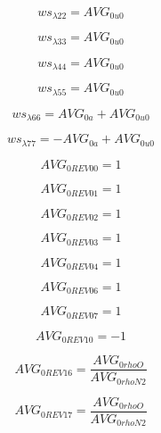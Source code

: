 \documentclass{article}
\begin{document}
\begin{dmath}ws_{\lambda 22} = AVG_{0 u0}\end{dmath}

\begin{dmath}ws_{\lambda 33} = AVG_{0 u0}\end{dmath}

\begin{dmath}ws_{\lambda 44} = AVG_{0 u0}\end{dmath}

\begin{dmath}ws_{\lambda 55} = AVG_{0 u0}\end{dmath}

\begin{dmath}ws_{\lambda 66} = AVG_{0 a} + AVG_{0 u0}\end{dmath}

\begin{dmath}ws_{\lambda 77} = - AVG_{0 a} + AVG_{0 u0}\end{dmath}

\begin{dmath}AVG_{0 REV 00} = 1\end{dmath}

\begin{dmath}AVG_{0 REV 01} = 1\end{dmath}

\begin{dmath}AVG_{0 REV 02} = 1\end{dmath}

\begin{dmath}AVG_{0 REV 03} = 1\end{dmath}

\begin{dmath}AVG_{0 REV 04} = 1\end{dmath}

\begin{dmath}AVG_{0 REV 06} = 1\end{dmath}

\begin{dmath}AVG_{0 REV 07} = 1\end{dmath}

\begin{dmath}AVG_{0 REV 10} = -1\end{dmath}

\begin{dmath}AVG_{0 REV 16} = \frac{AVG_{0 rhoO}}{AVG_{0 rhoN2}}\end{dmath}

\begin{dmath}AVG_{0 REV 17} = \frac{AVG_{0 rhoO}}{AVG_{0 rhoN2}}\end{dmath}
\end{document}
